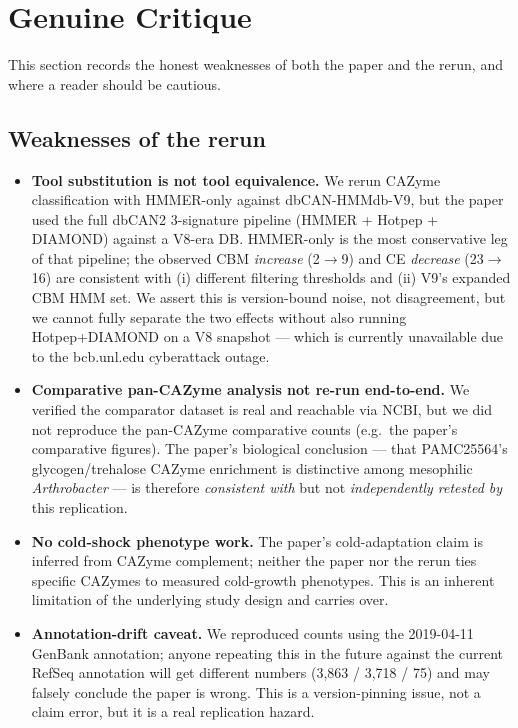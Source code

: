 \documentclass[11pt]{article}
\begin{document}
\section{Genuine Critique}
This section records the honest weaknesses of both the paper and the rerun, and where a reader should be cautious.

\subsection{Weaknesses of the rerun}
\begin{itemize}
  \item \textbf{Tool substitution is not tool equivalence.} We rerun CAZyme classification with HMMER-only against dbCAN-HMMdb-V9, but the paper used the full dbCAN2 3-signature pipeline (HMMER + Hotpep + DIAMOND) against a V8-era DB. HMMER-only is the most conservative leg of that pipeline; the observed CBM \emph{increase} (2$\rightarrow$9) and CE \emph{decrease} (23$\rightarrow$16) are consistent with (i) different filtering thresholds and (ii) V9's expanded CBM HMM set. We assert this is version-bound noise, not disagreement, but we cannot fully separate the two effects without also running Hotpep+DIAMOND on a V8 snapshot --- which is currently unavailable due to the bcb.unl.edu cyberattack outage.
  \item \textbf{Comparative pan-CAZyme analysis not re-run end-to-end.} We verified the comparator dataset is real and reachable via NCBI, but we did not reproduce the pan-CAZyme comparative counts (e.g.\ the paper's comparative figures). The paper's biological conclusion --- that PAMC25564's glycogen/trehalose CAZyme enrichment is distinctive among mesophilic \emph{Arthrobacter} --- is therefore \emph{consistent with} but not \emph{independently retested by} this replication.
  \item \textbf{No cold-shock phenotype work.} The paper's cold-adaptation claim is inferred from CAZyme complement; neither the paper nor the rerun ties specific CAZymes to measured cold-growth phenotypes. This is an inherent limitation of the underlying study design and carries over.
  \item \textbf{Annotation-drift caveat.} We reproduced counts using the 2019-04-11 GenBank annotation; anyone repeating this in the future against the current RefSeq annotation will get different numbers (3{,}863 / 3{,}718 / 75) and may falsely conclude the paper is wrong. This is a version-pinning issue, not a claim error, but it is a real replication hazard.
\end{itemize}
\end{document}
